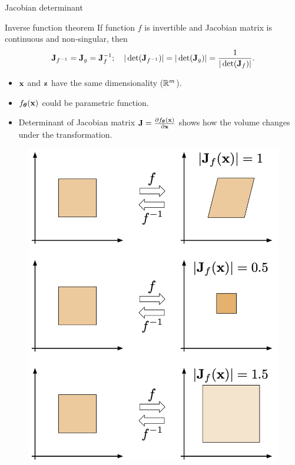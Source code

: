 \begin{frame}{Jacobian determinant}
	\begin{block}{Inverse function theorem}
		If function $f$ is invertible and Jacobian matrix is continuous and non-singular, then
		\vspace{-0.3cm}
		\[
		\mathbf{J}_{f^{-1}} = \mathbf{J}_{g} = \mathbf{J}_f^{-1}; \quad |\det (\mathbf{J}_{f^{-1}})| = |\det (\mathbf{J}_g)| = \frac{1}{|\det (\mathbf{J}_f)|}.
		\]
		\vspace{-0.3cm}
	\end{block}
	\begin{minipage}{0.55\columnwidth}
		\begin{itemize}
			\item $\mathbf{x}$ and $\mathbf{z}$ have the same dimensionality ($\mathbb{R}^m$).
			\vfill
			\item $f_{\boldsymbol{\theta}}(\mathbf{x})$ could be parametric function.
			\vfill
			\item Determinant  of Jacobian matrix $\mathbf{J} =\frac{\partial f_{\boldsymbol{\theta}}(\mathbf{x})}{\partial \mathbf{x}}$ shows how the volume changes under the transformation.
		\end{itemize}
	\end{minipage}%
	\begin{minipage}{0.45\columnwidth}
		\begin{figure}
			\includegraphics[width=0.8\linewidth]{figs/jacobian_det}
		\end{figure}
	\end{minipage}
\end{frame}
